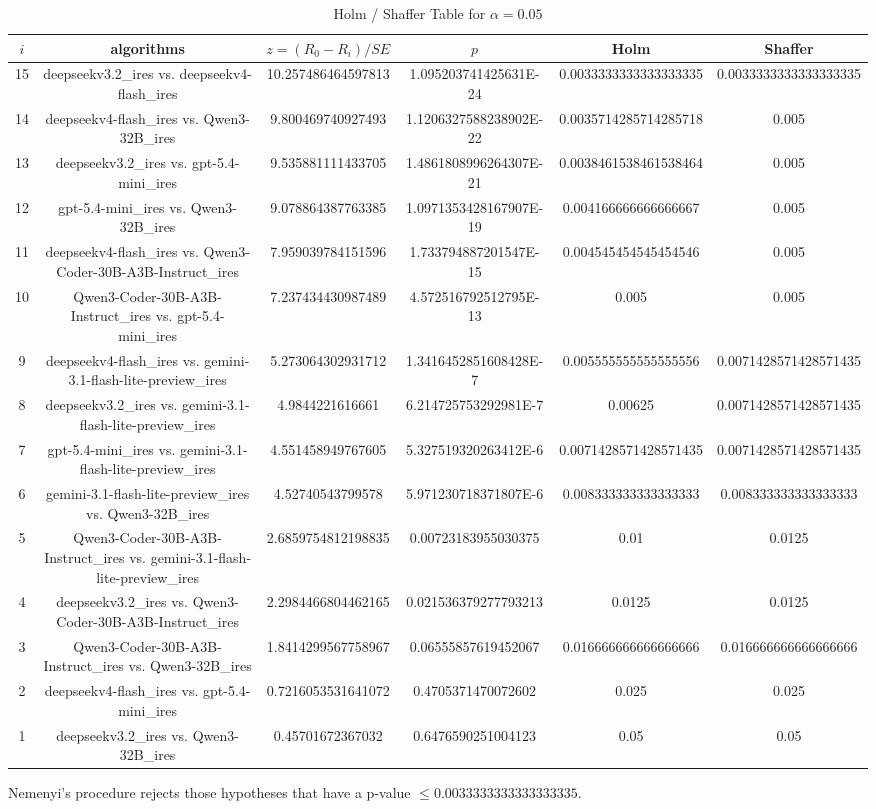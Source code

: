 \documentclass[a4paper,10pt]{article}
\begin{document}
\begin{landscape}
\begin{table}[!htp]
\centering\tiny
\caption{Holm / Shaffer Table for $\alpha=0.05$}
\begin{tabular}{cccccc}
$i$&algorithms&$z=(R_0 - R_i)/SE$&$p$&Holm&Shaffer\\
\hline
15&deepseekv3.2_ires vs. deepseekv4-flash_ires&10.257486464597813&1.095203741425631E-24&0.0033333333333333335&0.0033333333333333335\\14&deepseekv4-flash_ires vs. Qwen3-32B_ires&9.800469740927493&1.1206327588238902E-22&0.0035714285714285718&0.005\\13&deepseekv3.2_ires vs. gpt-5.4-mini_ires&9.535881111433705&1.4861808996264307E-21&0.0038461538461538464&0.005\\12&gpt-5.4-mini_ires vs. Qwen3-32B_ires&9.078864387763385&1.0971353428167907E-19&0.004166666666666667&0.005\\11&deepseekv4-flash_ires vs. Qwen3-Coder-30B-A3B-Instruct_ires&7.959039784151596&1.733794887201547E-15&0.004545454545454546&0.005\\10&Qwen3-Coder-30B-A3B-Instruct_ires vs. gpt-5.4-mini_ires&7.237434430987489&4.572516792512795E-13&0.005&0.005\\9&deepseekv4-flash_ires vs. gemini-3.1-flash-lite-preview_ires&5.273064302931712&1.3416452851608428E-7&0.005555555555555556&0.0071428571428571435\\8&deepseekv3.2_ires vs. gemini-3.1-flash-lite-preview_ires&4.9844221616661&6.214725753292981E-7&0.00625&0.0071428571428571435\\7&gpt-5.4-mini_ires vs. gemini-3.1-flash-lite-preview_ires&4.551458949767605&5.327519320263412E-6&0.0071428571428571435&0.0071428571428571435\\6&gemini-3.1-flash-lite-preview_ires vs. Qwen3-32B_ires&4.52740543799578&5.971230718371807E-6&0.008333333333333333&0.008333333333333333\\5&Qwen3-Coder-30B-A3B-Instruct_ires vs. gemini-3.1-flash-lite-preview_ires&2.6859754812198835&0.00723183955030375&0.01&0.0125\\4&deepseekv3.2_ires vs. Qwen3-Coder-30B-A3B-Instruct_ires&2.2984466804462165&0.021536379277793213&0.0125&0.0125\\3&Qwen3-Coder-30B-A3B-Instruct_ires vs. Qwen3-32B_ires&1.8414299567758967&0.06555857619452067&0.016666666666666666&0.016666666666666666\\2&deepseekv4-flash_ires vs. gpt-5.4-mini_ires&0.7216053531641072&0.4705371470072602&0.025&0.025\\1&deepseekv3.2_ires vs. Qwen3-32B_ires&0.45701672367032&0.6476590251004123&0.05&0.05\\\hline
\end{tabular}
\end{table}
Nemenyi's procedure rejects those hypotheses that have a p-value $\le0.0033333333333333335$.



\end{landscape}
\end{document}
